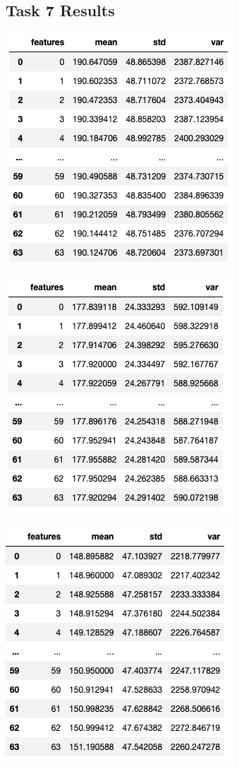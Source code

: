 \documentclass{article}
\begin{document}
\begin{multicols}{2}
	\subsection{Task 7 Results}
	\centering
		\includegraphics[scale=0.2]{../screenshots/img_0_sum.png}
	
	\centering
		\includegraphics[scale=0.2]{../screenshots/img_1_sum.png}
	
	\centering
		\includegraphics[scale=0.2]{../screenshots/img_2_sum.png}
	

\end{multicols}
\end{document}
